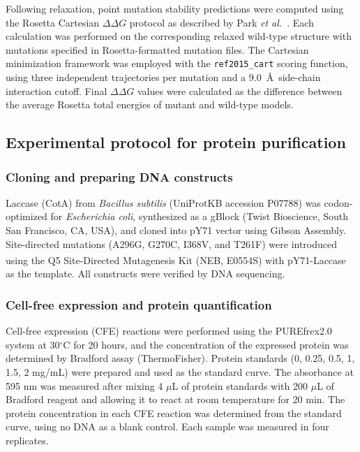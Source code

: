 Following relaxation, point mutation stability predictions were computed using the Rosetta Cartesian $\Delta\Delta G$ protocol as described by Park \textit{et al.}~\citep{park2018cartesian}. Each calculation was performed on the corresponding relaxed wild-type structure with mutations specified in Rosetta-formatted mutation files. The Cartesian minimization framework was employed with the \texttt{ref2015\_cart} scoring function, using three independent trajectories per mutation and a 9.0~\AA\ side-chain interaction cutoff. Final $\Delta\Delta G$ values were calculated as the difference between the average Rosetta total energies of mutant and wild-type models.

\subsection{Experimental protocol for protein purification}\label{sec:protein_purification}

\subsubsection{Cloning and preparing DNA constructs}
Laccase (CotA) from \textit{Bacillus subtilis} (UniProtKB accession P07788) was codon-optimized for \textit{Escherichia coli}, synthesized as a gBlock (Twist Bioscience, South San Francisco, CA, USA), and cloned into pY71 vector using Gibson Assembly. Site-directed mutations (A296G, G270C, I368V, and T261F) were introduced using the Q5\textsuperscript{\textregistered} Site-Directed Mutagenesis Kit (NEB, E0554S) with pY71-Laccase as the template. All constructs were verified by DNA sequencing.

\subsubsection{Cell-free expression and protein quantification}
Cell-free expression (CFE) reactions were performed using the PUREfrex2.0 system at 30$^\circ$C for 20 hours, and the concentration of the expressed protein was determined by Bradford assay (ThermoFisher). Protein standards (0, 0.25, 0.5, 1, 1.5, 2 mg/mL) were prepared and used as the standard curve. The absorbance at 595 nm was measured after mixing 4 $\mu$L of protein standards with 200 $\mu$L of Bradford reagent and allowing it to react at room temperature for 20 min. The protein concentration in each CFE reaction was determined from the standard curve, using no DNA as a blank control. Each sample was measured in four replicates.

